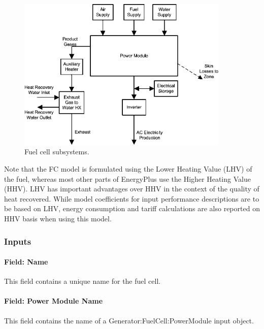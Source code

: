 \begin{figure}[hbtp] %
\centering
\includegraphics[width=0.9\textwidth, height=0.9\textheight, keepaspectratio=true]{media/image467.png}
\caption{Fuel cell subsystems. \protect \label{fig:fuel-cell-subsystems.}}
\end{figure}

Note that the FC model is formulated using the Lower Heating Value (LHV) of the fuel, whereas most other parts of EnergyPlus use the Higher Heating Value (HHV). LHV has important advantages over HHV in the context of the quality of heat recovered. While model coefficients for input performance descriptions are to be based on LHV, energy consumption and tariff calculations are also reported on HHV basis when using this model.

\subsubsection{Inputs}\label{inputs-12-003}

\paragraph{Field: Name}\label{field-name-13-002}

This field contains a unique name for the fuel cell.

\paragraph{Field: Power Module Name}\label{field-power-module-name}

This field contains the name of a Generator:FuelCell:PowerModule input object.

